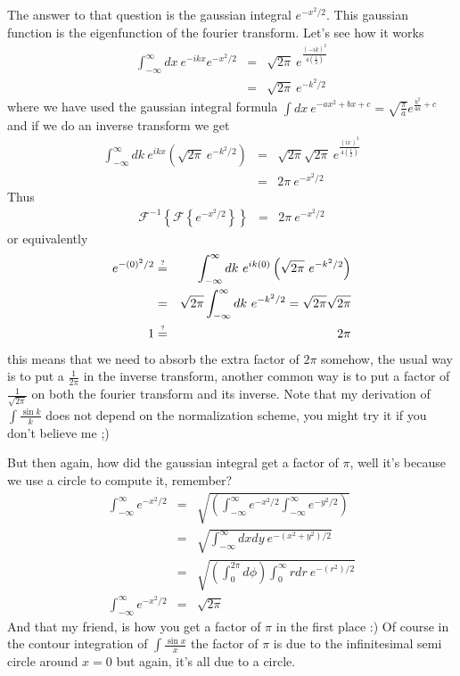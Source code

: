 \documentclass[aps,preprint,preprintnumbers,nofootinbib,showpacs,prd]{revtex4-1}
\newcommand{\nbea}{\begin{eqnarray*}}
\newcommand{\neea}{\end{eqnarray*}}
\begin{document}
The answer to that question is the gaussian integral $e^{-x^2/2}$. This gaussian function is the eigenfunction of the fourier transform. Let's see how it works
%
\nbea
\int_{-\infty}^{\infty} dx~ e^{-ikx} e^{-x^2/2} & = & \sqrt{2 \pi} ~e^{\frac{(-ik)^2}{4\left( \frac{1}{2} \right)}} \\
& = & \sqrt{2 \pi} ~e^{-k^2/2}
\neea
%
where we have used the gaussian integral formula $\int dx~e^{-ax^2 + bx + c} = \sqrt{\frac{\pi}{a}} e^{\frac{b^2}{4a} + c}$ and if we do an inverse transform we get
%
\nbea
\int_{-\infty}^{\infty} dk~ e^{ikx} \left ( \sqrt{2 \pi} ~e^{-k^2/2} \right ) & = & \sqrt{2 \pi}\sqrt{2 \pi}~ e^{\frac{(ix)^2}{4\left( \frac{1}{2} \right)}} \\
& = & 2 \pi ~e^{-x^2/2}
\neea
%
Thus
%
\nbea
\mathcal{F}^{-1} \left \{ \mathcal{F} \left \{ e^{-x^2/2}\right \} \right \} & = & 2 \pi ~e^{-x^2/2}
\neea
%
or equivalently
%
\nbea
e^{-(0)^2/2} & \stackrel{\text{\tiny ?}}{=} & \int_{-\infty}^{\infty} dk~ e^{ik(0)} \left ( \sqrt{2 \pi} ~e^{-k^2/2} \right ) \\
& = & \sqrt{2 \pi} \int_{-\infty}^{\infty} dk~e^{-k^2/2} =  \sqrt{2 \pi} \sqrt{2 \pi} \\
1 & \stackrel{\text{\tiny ?}}{=} & 2 \pi
\neea
%
this means that we need to absorb the extra factor of $2 \pi$ somehow, the usual way is to put a $\frac{1}{2\pi}$ in the inverse transform, another common way is to put a factor of $\frac{1}{\sqrt{2 \pi}}$ on both the fourier transform and its inverse. Note that my derivation of $\int \frac{\sin k}{k}$ does not depend on the normalization scheme, you might try it if you don't believe me ;)

But then again, how did the gaussian integral get a factor of $\pi$, well it's because we use a circle to compute it, remember?
%
\nbea
\int_{-\infty}^{\infty} e^{-x^2/2} & = & \sqrt {\left ( \int_{-\infty}^{\infty} e^{-x^2/2} \int_{-\infty}^{\infty} e^{-y^2/2}\right ) } \\
& = & \sqrt { \int_{-\infty}^{\infty} dx dy ~ e^{-(x^2 + y^2)/2}} \\
& = & \sqrt { \left ( \int_0^{2\pi} d\phi \right )\int_{0}^{\infty} r dr  ~ e^{-(r^2)/2}} \\
\int_{-\infty}^{\infty} e^{-x^2/2} & = & \sqrt {2 \pi}
\neea
%
And that my friend, is how you get a factor of $\pi$ in the first place :) Of course in the contour integration of $\int \frac{\sin x}{x}$ the factor of $\pi$ is due to the infinitesimal semi circle around $x=0$ but again, it's all due to a circle.
\end{document}
